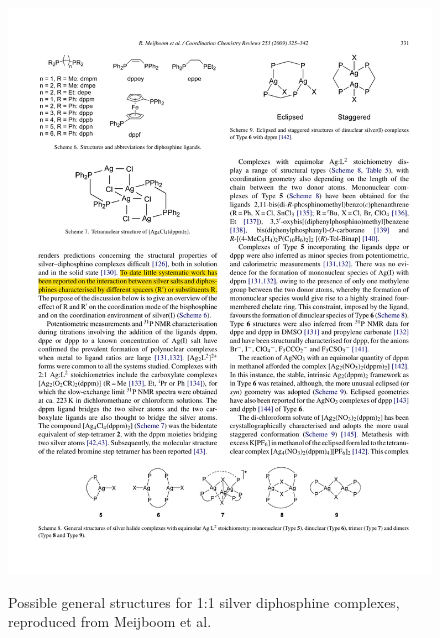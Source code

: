 \begin{figure}[h]
\begin{center}
\vspace{0.5cm}
\includegraphics{../Figures/Possiblesilverstructures.pdf}
\caption[Possible general structures for 1:1 silver diphosphine complexes]{Possible general structures for 1:1 silver diphosphine complexes, reproduced from Meijboom et al.\cite{Meijboom2009}}
\vspace{0.2cm}
\label{Silverstructures}
\end{center}
\end{figure}
\vspace{0.2cm}


